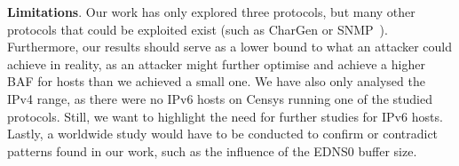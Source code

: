 \textbf{Limitations}. Our work has only explored three protocols, but many other protocols that could be exploited exist (such as CharGen or SNMP~\cite{amplification_hell}). Furthermore, our results should serve as a lower bound to what an attacker could achieve in reality, as an attacker might further optimise and achieve a higher BAF for hosts than we achieved a small one. We have also only analysed the IPv4 range, as there were no IPv6 hosts on Censys running one of the studied protocols. Still, we want to highlight the need for further studies for IPv6 hosts. Lastly, a worldwide study would have to be conducted to confirm or contradict patterns found in our work, such as the influence of the EDNS0 buffer size.  
